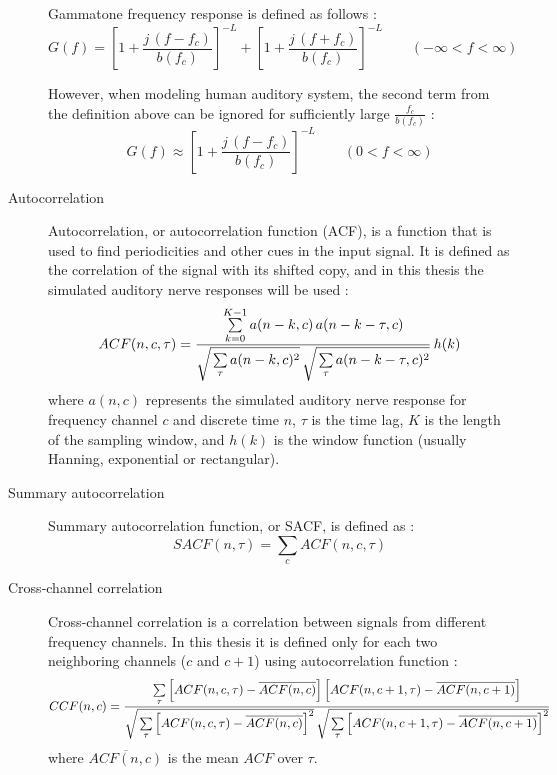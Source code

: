 \begin{description}
	Gammatone frequency response is defined as follows \cite{Holdsworth1988}:
	\begin{equation}
		G(f) = \left[1 + \frac{j\,(f - f_c)}{b(f_c)}\right]^{-L} + 
		\left[1 + \frac{j\,(f + f_c)}{b(f_c)}\right]^{-L}
		\qquad\left(-\infty < f < \infty\right)
	\end{equation}
	
	However, when modeling human auditory system, the second term from the definition above can be ignored for sufficiently large $\frac{f_c}{b(f_c)}$ \cite{Wang2006}\cite{Holdsworth1988}:
	\begin{equation}
		G(f)\approx\left[1 + \frac{j\,(f - f_c)}{b(f_c)}\right]^{-L}
		\qquad\left(0 < f < \infty\right)
	\end{equation}
	
	\item[Autocorrelation] Autocorrelation, or autocorrelation function (ACF), is a function that is used to find periodicities and other cues in the input signal. It is defined as the correlation of the signal with its shifted copy, and in this thesis the simulated auditory nerve responses will be used \cite{Wang2006}:
	\begin{equation}
		ACF(n, c, \tau) = \frac{
			\sum\limits_{k=0}^{K-1}a(n - k, c)\,a(n - k -\tau, c)
		}{
			\sqrt{\strut\sum\limits_{\tau}{a(n - k, c)^2}}\,
			\sqrt{\strut\sum\limits_{\tau}{a(n - k - \tau, c)^2}}
		}\,h(k)
	\end{equation}
	where $a(n, c)$ represents the simulated auditory nerve response for frequency channel $c$ and discrete time $n$, $\tau$ is the time lag, $K$ is the length of the sampling window, and $h(k)$ is the window function (usually Hanning, exponential or rectangular).
	
	\item[Summary autocorrelation] Summary autocorrelation function, or SACF, is defined as \cite{Wang2006}\cite{Virtanen2012}:
	\begin{equation}
		SACF(n, \tau) = \sum_c{ACF(n, c, \tau)}
	\end{equation}
	
	\item[Cross-channel correlation] Cross-channel correlation is a correlation between signals from different frequency channels. In this thesis it is defined only for each two neighboring channels ($c$ and $c + 1$) using autocorrelation function \cite{Virtanen2012}: 
	\begin{equation}
		CCF(n, c) = \frac{
			\sum\limits_{\tau}{
				\left[ACF(n, c, \tau) - \overline{ACF(n, c)}\right]
				\left[ACF(n, c + 1, \tau) - \overline{ACF(n, c + 1)}\right]}
		}{
			\sqrt{\strut\sum\limits_{\tau}{
				\left[ACF(n, c, \tau) - \overline{ACF(n, c)}\right]^2}}\,
			\sqrt{\strut\sum\limits_{\tau}{
				\left[ACF(n, c + 1, \tau) - \overline{ACF(n, c + 1)}\right]^2}}
		}
	\end{equation}
	where $\overline{ACF(n, c)}$ is the mean $ACF$ over $\tau$.
\end{description}
